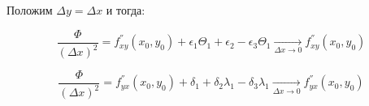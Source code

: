 \documentclass{article}
\begin{document}
Положим $\Delta y = \Delta x$ и тогда:

$$
\frac{\Phi}{(\Delta x)^2} = f_{x y}^{''}(x_0, y_0) + \epsilon_1\Theta_1 + \epsilon_2  - \epsilon_3\Theta_1\underset{\Delta x \to 0}{\longrightarrow} f_{x y}^{''}(x_0, y_0)
$$ 

$$
\frac{\Phi}{(\Delta x)^2} = f_{y x}^{''}(x_0, y_0) + \delta_1 + \delta_2\lambda_1 - \delta_3\lambda_1 \underset{\Delta x \to 0}{\longrightarrow} f_{y x}^{''}(x_0, y_0)
$$
\end{document}
